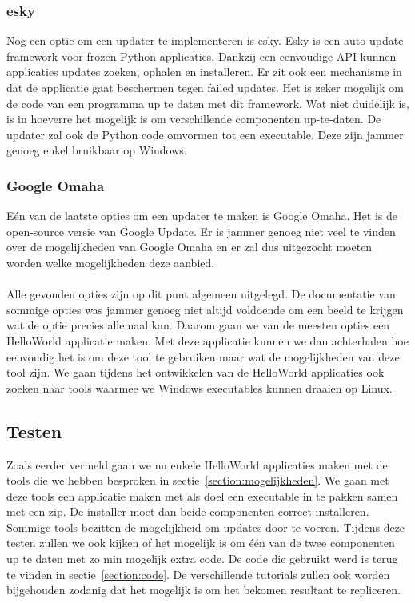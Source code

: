 \documentclass{article}
\begin{document}
\subsubsection{esky \citep{eskyMain}}
Nog een optie om een updater te implementeren is esky.
Esky is een auto-update framework voor frozen Python applicaties.
Dankzij een eenvoudige API kunnen applicaties updates zoeken, ophalen en installeren.
Er zit ook een mechanisme in dat de applicatie gaat beschermen tegen failed updates.
Het is zeker mogelijk om de code van een programma up te daten met dit framework.
Wat niet duidelijk is, is in hoeverre het mogelijk is om verschillende componenten up-te-daten.
De updater zal ook de Python code omvormen tot een executable.
Deze zijn jammer genoeg enkel bruikbaar op Windows.

\subsubsection{Google Omaha \citep{omahaMain}}
E\'en van de laatste opties om een updater te maken is Google Omaha.
Het is de open-source versie van Google Update.
Er is jammer genoeg niet veel te vinden over de mogelijkheden van Google Omaha en er zal dus uitgezocht moeten worden welke mogelijkheden deze aanbied.

\paragraph{}
Alle gevonden opties zijn op dit punt algemeen uitgelegd.
De documentatie van sommige opties was jammer genoeg niet altijd voldoende om een beeld te krijgen wat de optie precies allemaal kan.
Daarom gaan we van de meesten opties een HelloWorld applicatie maken.
Met deze applicatie kunnen we dan achterhalen hoe eenvoudig het is om deze tool te gebruiken maar wat de mogelijkheden van deze tool zijn.
We gaan tijdens het ontwikkelen van de HelloWorld applicaties ook zoeken naar tools waarmee we Windows executables kunnen draaien op Linux.

\subsection{Testen}
Zoals eerder vermeld gaan we nu enkele HelloWorld applicaties maken met de tools die we hebben besproken in sectie~\vref{section:mogelijkheden}.
We gaan met deze tools een applicatie maken met als doel een executable in te pakken samen met een zip.
De installer moet dan beide componenten correct installeren.
Sommige tools bezitten de mogelijkheid om updates door te voeren.
Tijdens deze testen zullen we ook kijken of het mogelijk is om \'e\'en van de twee componenten up te daten met zo min mogelijk extra code.
De code die gebruikt werd is terug te vinden in sectie~\vref{section:code}.
De verschillende tutorials zullen ook worden bijgehouden zodanig dat het mogelijk is om het bekomen resultaat te repliceren.
\end{document}
